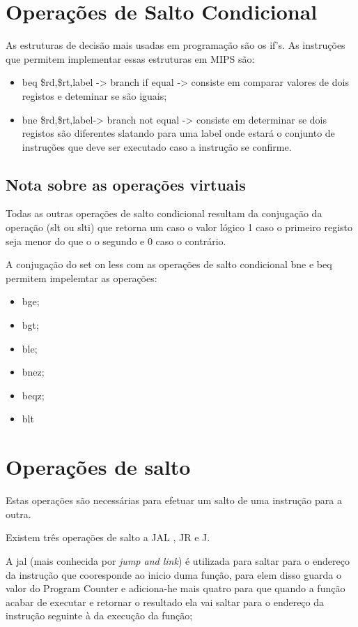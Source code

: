 \documentclass[10pt,a4paper]{book}
\begin{document}
  \section{Operações de Salto Condicional}

  As estruturas de decisão mais usadas em programação são os if's. As instruções que permitem implementar essas estruturas em MIPS são:
    \begin{itemize}
     \item beq \$rd,\$rt,label -> branch if equal -> consiste em comparar valores de dois registos e deteminar se são iguais;
     \item bne \$rd,\$rt,label-> branch not equal -> consiste em determinar se dois registos são diferentes slatando para uma label onde estará o conjunto de instruções que deve ser executado caso a instrução se confirme.
    \end{itemize}

     \subsection{Nota sobre as operações virtuais}

	Todas as outras operações de salto condicional resultam da conjugação da operação (slt ou slti) que retorna um caso o valor lógico 1 caso o primeiro registo seja menor do que o o segundo e 0 caso o contrário.

	A conjugação do set on less com as operações de salto condicional bne e beq permitem impelemtar as operações:
	    \begin{itemize}
	     \item bge;
	     \item bgt;
	     \item ble;
	     \item bnez;
	     \item beqz;
	     \item blt
	   \end{itemize}

 	\section{Operações de salto}

 		Estas operações são necessárias para efetuar um salto de uma instrução para a outra.

 		Existem três operações de salto a JAL , JR e J.

 		A jal (mais conhecida por \textit{jump and link}) é utilizada para saltar para o endereço da instrução que cooresponde ao inicio duma função, para elem disso guarda o valor do Program Counter e adiciona-he mais quatro para que quando a função acabar de executar e retornar o resultado ela vai saltar para o endereço da instrução seguinte à da execução da função;
\end{document}
